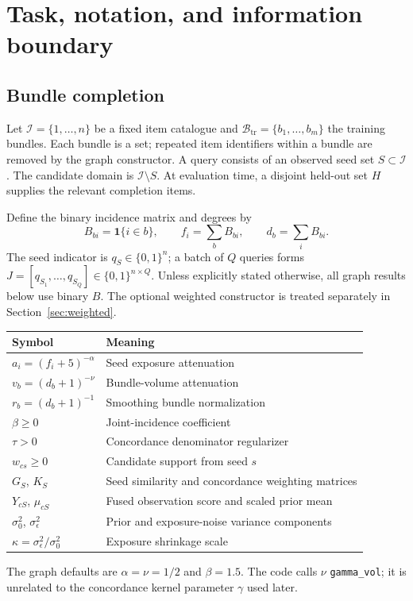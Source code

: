 \documentclass[11pt,a4paper]{article}
\theoremstyle{remark}
\newcommand{\ind}{\mathbf{1}}
\newcommand{\calI}{\mathcal{I}}
\newcommand{\calB}{\mathcal{B}_{\mathrm{tr}}}
\newcommand{\code}[1]{\texttt{\small #1}}
\begin{document}
\section{Task, notation, and information boundary}
\subsection{Bundle completion}
Let $\calI=\{1,\ldots,n\}$ be a fixed item catalogue and
$\calB=\{b_1,\ldots,b_m\}$ the training bundles. Each bundle is a set;
repeated item identifiers within a bundle are removed by the graph
constructor. A query consists of an observed seed set $S\subset\calI$.
The candidate domain is $\calI\setminus S$. At evaluation time, a disjoint
held-out set $H$ supplies the relevant completion items.

Define the binary incidence matrix and degrees by
\begin{equation}
 B_{bi}=\ind\{i\in b\},\qquad
 f_i=\sum_b B_{bi},\qquad d_b=\sum_i B_{bi}.
 \label{eq:incidence}
\end{equation}
The seed indicator is $q_S\in\{0,1\}^n$; a batch of $Q$ queries forms
$J=[q_{S_1},\ldots,q_{S_Q}]\in\{0,1\}^{n\times Q}$.
Unless explicitly stated otherwise, all graph results below use binary $B$.
The optional weighted constructor is treated separately in
Section~\ref{sec:weighted}.

\begin{center}
\begin{tabular}{@{}ll@{}}
\toprule
Symbol & Meaning \\
\midrule
$a_i=(f_i+5)^{-\alpha}$ & Seed exposure attenuation \\
$v_b=(d_b+1)^{-\nu}$ & Bundle-volume attenuation \\
$r_b=(d_b+1)^{-1}$ & Smoothing bundle normalization \\
$\beta\geq0$ & Joint-incidence coefficient \\
$\tau>0$ & Concordance denominator regularizer \\
$w_{cs}\geq0$ & Candidate support from seed $s$ \\
$G_S$, $K_S$ & Seed similarity and concordance weighting matrices \\
$Y_{cS}$, $\mu_{cS}$ & Fused observation score and scaled prior mean \\
$\sigma_0^2$, $\sigma_\epsilon^2$ & Prior and exposure-noise variance components \\
$\kappa=\sigma_\epsilon^2/\sigma_0^2$ & Exposure shrinkage scale \\
\bottomrule
\end{tabular}
\end{center}
The graph defaults are $\alpha=\nu=1/2$ and $\beta=1.5$.
The code calls $\nu$ \code{gamma\_vol}; it is unrelated to the concordance
kernel parameter $\gamma$ used later.
\end{document}

